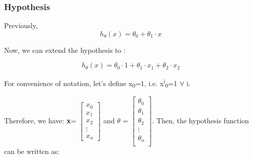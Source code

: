     \subsubsection{Hypothesis}

        Previously, 
        \[ 
        h_\theta(x)= \theta_0 + \theta_1\cdot x 
        \]
    

        Now, we can extend the hypothesis to :

        \[
            h_\theta(x) = \theta_0\cdot1 + \theta_1\cdot x_1 + \theta_2\cdot x_2  
        \]

        For convenience of notation, let's define x\textsubscript{0}=1, i.e. x\textsuperscript{i}\textsubscript{0}=1 $\forall$ i.

        Therefore, we have: \textbf{x}= $\left[ \begin{array}{c}
                                                    x_0 \\
                                                    x_1 \\
                                                    x_2 \\
                                                    \vdots \\
                                                    x_n
                                                 \end{array}
                                          \right]$
                                          and \textbf{$\theta$} = $\left[ \begin{array}{c}
                                                    \theta_0 \\
                                                    \theta_1 \\
                                                    \theta_2 \\
                                                    \vdots \\
                                                    \theta_n \\
                                                 \end{array}
                                          \right]$. 
        Then, the hypothesis function can be written as:

